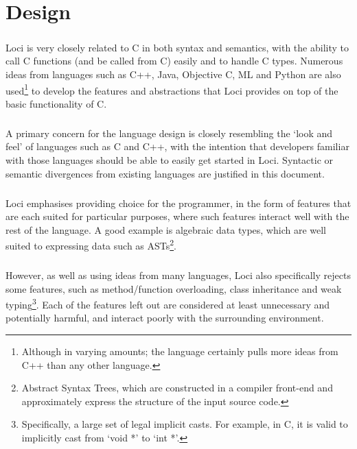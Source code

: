 \documentclass[12pt,twoside,notitlepage]{report}
\begin{document}
\cleardoublepage

\chapter{Design}

\paragraph{}
Loci is very closely related to C in both syntax and semantics, with the ability to call C functions (and be called from C) easily and to handle C types. Numerous ideas from languages such as C++, Java, Objective C, ML and Python are also used\footnote{Although in varying amounts; the language certainly pulls more ideas from C++ than any other language.} to develop the features and abstractions that Loci provides on top of the basic functionality of C.

\paragraph{}
A primary concern for the language design is closely resembling the `look and feel' of languages such as C and C++, with the intention that developers familiar with those languages should be able to easily get started in Loci. Syntactic or semantic divergences from existing languages are justified in this document.

\paragraph{}
Loci emphasises providing choice for the programmer, in the form of features that are each suited for particular purposes, where such features interact well with the rest of the language. A good example is algebraic data types, which are well suited to expressing data such as ASTs\footnote{Abstract Syntax Trees, which are constructed in a compiler front-end and approximately express the structure of the input source code.}.

\paragraph{}
However, as well as using ideas from many languages, Loci also specifically rejects some features, such as method/function overloading, class inheritance and weak typing\footnote{Specifically, a large set of legal implicit casts. For example, in C, it is valid to implicitly cast from `void *' to `int *'.}. Each of the features left out are considered at least unnecessary and potentially harmful, and interact poorly with the surrounding environment.
\end{document}
